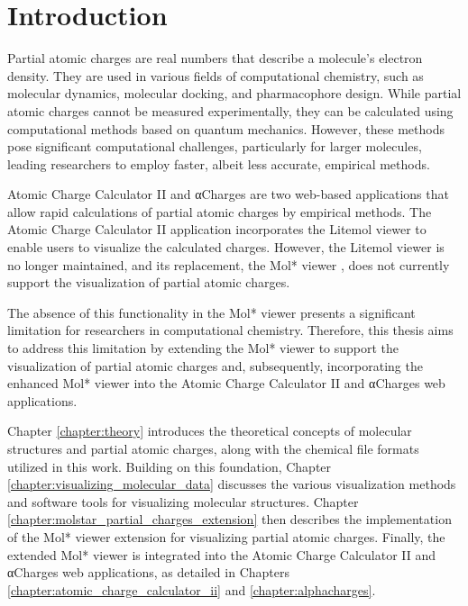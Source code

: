 \documentclass[
  digital,     %
  oneside,     %
  nosansbold,  %
  nocolorbold, %
  lof,         %
  lot,         %
]{fithesis4}
\begin{document}
\newpage
\chapter*{Introduction}
\label{chap:introduction}

Partial atomic charges are real numbers that describe a molecule's electron density. They are used in various fields of computational chemistry, such as molecular dynamics, molecular docking, and pharmacophore design. \cite{racek2022thesis} While partial atomic charges cannot be measured experimentally, they can be calculated using computational methods based on quantum mechanics. \cite{gupta2015principles} However, these methods pose significant computational challenges, particularly for larger molecules, leading researchers to employ faster, albeit less accurate, empirical methods. \cite{schindler2019thesis}

Atomic Charge Calculator II \cite{racek2020acc2} and αCharges \cite{schindler2023alphacharges} are two web-based applications that allow rapid calculations of partial atomic charges by empirical methods. The Atomic Charge Calculator II application incorporates the Litemol viewer \cite{sehnal2017litemol} to enable users to visualize the calculated charges. However, the Litemol viewer is no longer maintained, and its replacement, the Mol* viewer \cite{sehnal2021molstar}, does not currently support the visualization of partial atomic charges.

The absence of this functionality in the Mol* viewer presents a significant limitation for researchers in computational chemistry. Therefore, this thesis aims to address this limitation by extending the Mol* viewer to support the visualization of partial atomic charges and, subsequently, incorporating the enhanced Mol* viewer into the Atomic Charge Calculator II and αCharges web applications.

Chapter \ref{chapter:theory} introduces the theoretical concepts of molecular structures and partial atomic charges, along with the chemical file formats utilized in this work. Building on this foundation, Chapter \ref{chapter:visualizing_molecular_data} discusses the various visualization methods and software tools for visualizing molecular structures. Chapter \ref{chapter:molstar_partial_charges_extension} then describes the implementation of the Mol* viewer extension for visualizing partial atomic charges. Finally, the extended Mol* viewer is integrated into the Atomic Charge Calculator II and αCharges web applications, as detailed in Chapters \ref{chapter:atomic_charge_calculator_ii} and \ref{chapter:alphacharges}.
\end{document}
